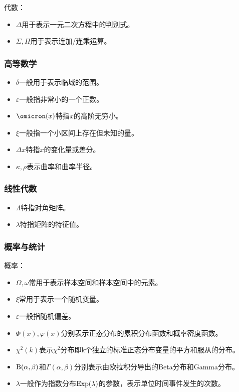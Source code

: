 代数：

\begin{itemize}
\item $\Delta$用于表示一元二次方程中的判别式。
\item $\Sigma,\Pi$用于表示连加/连乘运算。
\end{itemize}

\subsubsection{高等数学}

\begin{itemize}
\item $\delta$一般用于表示临域的范围。
\item $\varepsilon$一般指非常小的一个正数。
\item $\omicron (x)$特指$x$的高阶无穷小。
\item $\xi$一般指一个小区间上存在但未知的量。
\item $\Delta x$特指$x$的变化量或差分。
\item $\kappa,\rho$表示曲率和曲率半径。
\end{itemize}

\subsubsection{线性代数}

\begin{itemize}
\item $\Lambda$特指对角矩阵。
\item $\lambda$特指矩阵的特征值。
\end{itemize}

\subsubsection{概率与统计}

概率：
\begin{itemize}
\item $\Omega,\omega$常用于表示样本空间和样本空间中的元素。
\item $\xi$常用于表示一个随机变量。
\item $\varepsilon$一般指随机偏差。
\item $\Phi(x),\varphi(x)$分别表示正态分布的累积分布函数和概率密度函数。
\item $\chi^2(k)$表示$\chi^2$分布即k个独立的标准正态分布变量的平方和服从的分布。
\item ${\rm B(\alpha,\beta)}$和$\Gamma (\alpha,\beta)$分别表示由欧拉积分导出的Beta分布和Gamma分布。
\item $\lambda$一般作为指数分布${\rm Exp}(\lambda)$的参数，表示单位时间事件发生的次数。
\end{itemize}

